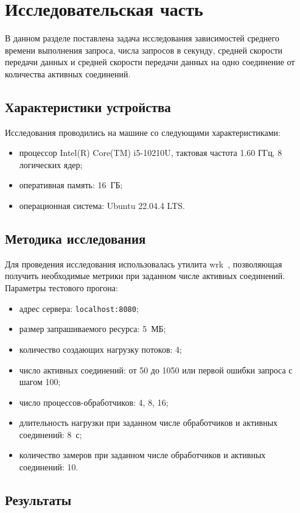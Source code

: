 \chapter{Исследовательская часть}

В данном разделе поставлена задача исследования зависимостей среднего времени выполнения запроса, числа запросов в секунду, средней скорости передачи данных и средней скорости передачи данных на одно соединение от количества активных соединений.
\section{Характеристики устройства}

Исследования проводились на машине со следующими характеристиками:
\begin{itemize}[label=---]
	\item процессор Intel(R) Core(TM) i5-10210U, тактовая частота 1.60 ГГц, 8 логических ядер;
	\item оперативная память: 16~ГБ;
	\item операционная система: Ubuntu 22.04.4 LTS.
\end{itemize}

\section{Методика исследования}

Для проведения исследования использовалась утилита wrk~\cite{ubuntu_wrk}, позволяющая получить необходимые метрики при заданном числе активных соединений. Параметры тестового прогона:
\begin{itemize}
	\item адрес сервера: \texttt{localhost:8080};
	\item размер запрашиваемого ресурса: 5~МБ;
	\item количество создающих нагрузку потоков: 4;
	\item число активных соединений: от 50 до 1050 или первой ошибки запроса с шагом 100;
	\item число процессов-обработчиков: 4, 8, 16;
	\item длительность нагрузки при заданном числе обработчиков и активных соединений: 8~с;
	\item количество замеров при заданном числе обработчиков и активных соединений: 10.
\end{itemize}

\section{Результаты}

